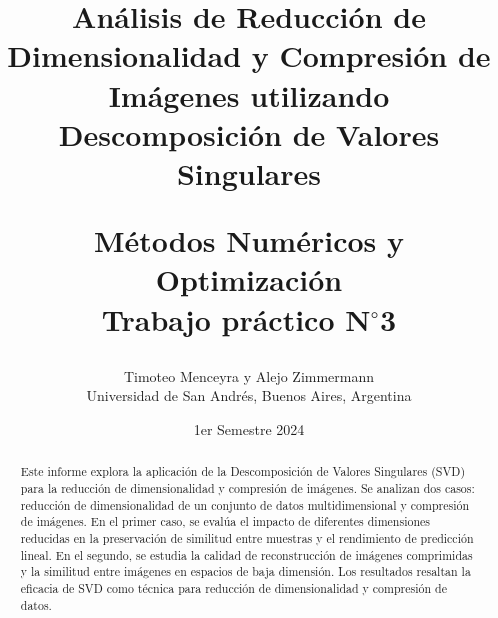 \documentclass[12pt,a4]{article} %
\title{Análisis de Reducción de Dimensionalidad y Compresión de Imágenes utilizando Descomposición de Valores Singulares\\


\vspace{20mm}

 Métodos Numéricos y Optimización\\
 Trabajo práctico N$^{\circ}$3\\
}
\author{Timoteo Menceyra y Alejo Zimmermann\\ [2mm] %
\small Universidad de San Andrés, Buenos Aires, Argentina}
\date{1er Semestre 2024}
\begin{document}
\vspace{1cm} %



\maketitle


\begin{abstract}
Este informe explora la aplicación de la Descomposición de Valores Singulares (SVD) para la reducción de dimensionalidad y compresión de imágenes. Se analizan dos casos: reducción de dimensionalidad de un conjunto de datos multidimensional y compresión de imágenes. En el primer caso, se evalúa el impacto de diferentes dimensiones reducidas en la preservación de similitud entre muestras y el rendimiento de predicción lineal. En el segundo, se estudia la calidad de reconstrucción de imágenes comprimidas y la similitud entre imágenes en espacios de baja dimensión. Los resultados resaltan la eficacia de SVD como técnica para reducción de dimensionalidad y compresión de datos.\\
\vspace{2mm}
\end{abstract}
\end{document}
